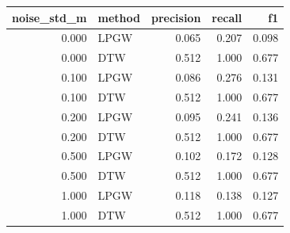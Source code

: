 \begin{tabular}{rlrrr}
\toprule
noise\_std\_m & method & precision & recall & f1 \\
\midrule
0.000 & LPGW & 0.065 & 0.207 & 0.098 \\
0.000 & DTW & 0.512 & 1.000 & 0.677 \\
0.100 & LPGW & 0.086 & 0.276 & 0.131 \\
0.100 & DTW & 0.512 & 1.000 & 0.677 \\
0.200 & LPGW & 0.095 & 0.241 & 0.136 \\
0.200 & DTW & 0.512 & 1.000 & 0.677 \\
0.500 & LPGW & 0.102 & 0.172 & 0.128 \\
0.500 & DTW & 0.512 & 1.000 & 0.677 \\
1.000 & LPGW & 0.118 & 0.138 & 0.127 \\
1.000 & DTW & 0.512 & 1.000 & 0.677 \\
\bottomrule
\end{tabular}
